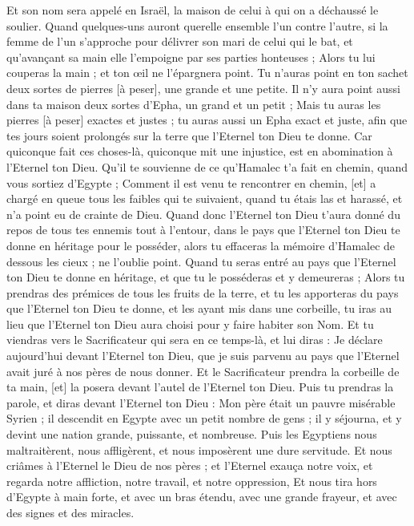 \begin{multicols}{2}
Et son nom sera appelé en Israël, la maison de celui à qui on a déchaussé le soulier.
Quand quelques-uns auront querelle ensemble l'un contre l'autre, si la femme de l'un s'approche pour délivrer son mari de celui qui le bat, et qu'avançant sa main elle l'empoigne par ses parties honteuses ;
Alors tu lui couperas la main ; et ton œil ne l'épargnera point.
Tu n'auras point en ton sachet deux sortes de pierres [à peser], une grande et une petite.
Il n'y aura point aussi dans ta maison deux sortes d'Epha, un grand et un petit ;
Mais tu auras les pierres [à peser] exactes et justes ; tu auras aussi un Epha exact et juste, afin que tes jours soient prolongés sur la terre que l'Eternel ton Dieu te donne.
Car quiconque fait ces choses-là, quiconque mit une injustice, est en abomination à l'Eternel ton Dieu.
Qu'il te souvienne de ce qu'Hamalec t'a fait en chemin, quand vous sortiez d'Egypte ;
Comment il est venu te rencontrer en chemin, [et] a chargé en queue tous les faibles qui te suivaient, quand tu étais las et harassé, et n'a point eu de crainte de Dieu.
Quand donc l'Eternel ton Dieu t'aura donné du repos de tous tes ennemis tout à l'entour, dans le pays que l'Eternel ton Dieu te donne en héritage pour le posséder, alors tu effaceras la mémoire d'Hamalec de dessous les cieux ; ne l'oublie point.
\VerseOne{}Quand tu seras entré au pays que l'Eternel ton Dieu te donne en héritage, et que tu le posséderas et y demeureras ;
Alors tu prendras des prémices de tous les fruits de la terre, et tu les apporteras du pays que l'Eternel ton Dieu te donne, et les ayant mis dans une corbeille, tu iras au lieu que l'Eternel ton Dieu aura choisi pour y faire habiter son Nom.
Et tu viendras vers le Sacrificateur qui sera en ce temps-là, et lui diras : Je déclare aujourd'hui devant l'Eternel ton Dieu, que je suis parvenu au pays que l'Eternel avait juré à nos pères de nous donner.
Et le Sacrificateur prendra la corbeille de ta main, [et] la posera devant l'autel de l'Eternel ton Dieu.
Puis tu prendras la parole, et diras devant l'Eternel ton Dieu : Mon père était un pauvre misérable Syrien ; il descendit en Egypte avec un petit nombre de gens ; il y séjourna, et y devint une nation grande, puissante, et nombreuse.
Puis les Egyptiens nous maltraitèrent, nous affligèrent, et nous imposèrent une dure servitude.
Et nous criâmes à l'Eternel le Dieu de nos pères ; et l'Eternel exauça notre voix, et regarda notre affliction, notre travail, et notre oppression,
Et nous tira hors d'Egypte à main forte, et avec un bras étendu, avec une grande frayeur, et avec des signes et des miracles.

\end{multicols}
